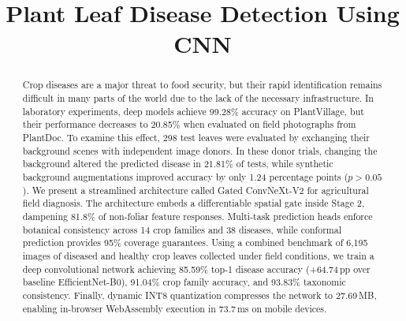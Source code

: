 \documentclass[conference]{IEEEtran}
\begin{document}
\title{Plant Leaf Disease Detection Using CNN}

\author{
}

\maketitle

\begin{abstract}
Crop diseases are a major threat to food security, but their rapid identification remains difficult in many parts of the world due to the lack of the necessary infrastructure. In laboratory experiments, deep models achieve 99.28\% accuracy on PlantVillage, but their performance decreases to 20.85\% when evaluated on field photographs from PlantDoc. To examine this effect, 298 test leaves were evaluated by exchanging their background scenes with independent image donors. In these donor trials, changing the background altered the predicted disease in 21.81\% of tests, while synthetic background augmentations improved accuracy by only 1.24 percentage points ($p>0.05$). We present a streamlined architecture called Gated ConvNeXt-V2 for agricultural field diagnosis. The architecture embeds a differentiable spatial gate inside Stage 2, dampening 81.8\% of non-foliar feature responses. Multi-task prediction heads enforce botanical consistency across 14 crop families and 38 diseases, while conformal prediction provides 95\% coverage guarantees. Using a combined benchmark of 6,195 images of diseased and healthy crop leaves collected under field conditions, we train a deep convolutional network achieving 85.59\% top-1 disease accuracy (+64.74\,pp over baseline EfficientNet-B0), 91.04\% crop family accuracy, and 93.83\% taxonomic consistency. Finally, dynamic INT8 quantization compresses the network to 27.69\,MB, enabling in-browser WebAssembly execution in 73.7\,ms on mobile devices.
\end{abstract}
\end{document}
